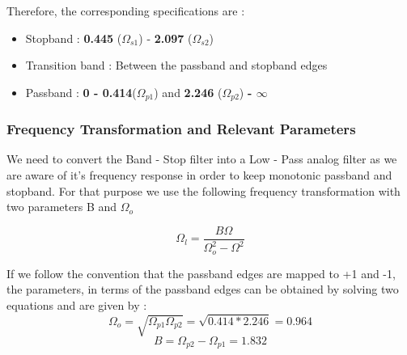 \documentclass{article}
\begin{document}
Therefore, the corresponding specifications are :
\begin{itemize}
    \item Stopband :  \textbf{0.445} ($\Omega_{s1}$) - \textbf{2.097} ($\Omega_{s2}$)
    \item  Transition band : Between the passband and stopband edges
    \item Passband : \textbf{0 - 0.414}($\Omega_{p1}$) and \textbf{2.246} ($\Omega_{p2}$) \textbf{- $\infty$}
\end{itemize}

\subsubsection{Frequency Transformation and Relevant Parameters}
We need to convert the Band - Stop filter into a Low - Pass analog filter as we are aware of it's frequency response in order to keep monotonic passband and stopband. For that purpose we use the following frequency transformation with two parameters B and $\Omega_o$

\begin{equation*}
    \Omega_l = \frac{B\Omega}{ \Omega_o^2 - \Omega^2}
\end{equation*}

\vspace{1em}
\noindent
If we follow the convention that the passband edges are mapped to +1 and -1, the parameters, in terms of the passband edges can be obtained by solving two equations and are given by :
\begin{equation*}
    \Omega_o = \sqrt{\Omega_{p1} \Omega_{p2}} = \sqrt{0.414*2.246} = 0.964
\end{equation*}\begin{equation*}
    B = \Omega_{p2}  - \Omega_{p1} = 1.832
\end{equation*}
\end{document}
